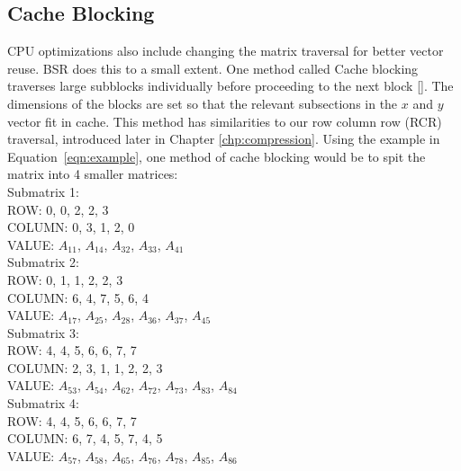 \subsection{Cache Blocking}
\label{sec:blocking}
\par CPU optimizations also include changing the matrix traversal for better vector reuse. BSR does this to a small extent. One method called Cache blocking traverses large subblocks individually before proceeding to the next block [\cite{prelim:nishtala}]. The dimensions of the blocks are set so that the relevant subsections in the $x$ and $y$ vector fit in cache. This method has similarities to our row column row (RCR) traversal, introduced later in Chapter \ref{chp:compression}. Using the example in Equation~\ref{eqn:example}, one method of cache blocking would be to spit the matrix into 4 smaller matrices:\\
Submatrix 1:\\
ROW: 0, 0, 2, 2, 3\\
COLUMN: 0, 3, 1, 2, 0\\
VALUE: $A_{11}$, $A_{14}$, $A_{32}$, $A_{33}$, $A_{41}$\\
Submatrix 2:\\
ROW: 0, 1, 1, 2, 2, 3\\
COLUMN: 6, 4, 7, 5, 6, 4\\
VALUE: $A_{17}$, $A_{25}$, $A_{28}$, $A_{36}$, $A_{37}$, $A_{45}$\\
Submatrix 3:\\
ROW: 4, 4, 5, 6, 6, 7, 7\\
COLUMN: 2, 3, 1, 1, 2, 2, 3\\
VALUE: $A_{53}$,  $A_{54}$, $A_{62}$, $A_{72}$, $A_{73}$, $A_{83}$, $A_{84}$\\
Submatrix 4:\\
ROW: 4, 4, 5, 6, 6, 7, 7\\
COLUMN: 6, 7, 4, 5, 7, 4, 5\\
VALUE: $A_{57}$, $A_{58}$, $A_{65}$, $A_{76}$, $A_{78}$, $A_{85}$, $A_{86}$\par


